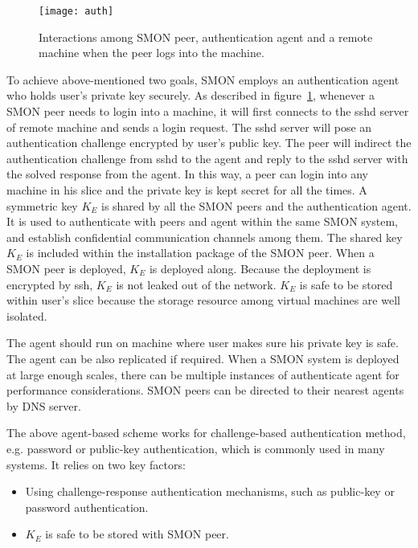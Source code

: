 \begin{figure}
\centering
\texttt{[image: auth]}
\caption{Interactions among SMON peer, authentication agent
and a remote machine when the peer logs into the machine.}
\label{fig:auth}
\end{figure}

To achieve above-mentioned two goals, SMON employs an
authentication agent who holds user's private key securely.
As described in figure~\ref{fig:auth}, whenever a SMON peer
needs to login into a machine, it will first connects to the
sshd server of remote machine and sends a login request. The
sshd server will pose an authentication challenge encrypted
by user's public key. The peer will indirect the
authentication challenge from sshd to the agent and reply to
the sshd server with the solved response from the agent. In
this way, a peer can login into any machine in his slice and
the private key is kept secret for all the times. A
symmetric key $K_E$ is shared by all the SMON peers and the
authentication agent. It is used to authenticate with peers
and agent within the same SMON system, and establish
confidential communication channels among them. The shared
key $K_E$ is included within the installation package of the
SMON peer. When a SMON peer is deployed, $K_E$ is deployed
along. Because the deployment is encrypted by ssh, $K_E$ is
not leaked out of the network. $K_E$ is safe to be stored
within user's slice because the storage resource among
virtual machines are well isolated.


The agent should run on machine where user makes sure his
private key is safe. The agent can be also replicated if
required. When a SMON system is deployed at large enough
scales, there can be multiple instances of authenticate
agent for performance considerations. SMON peers can be
directed to their nearest agents by DNS server.

The above agent-based scheme works for challenge-based
authentication method, e.g. password or public-key
authentication, which is commonly used in many systems.
It relies on two key factors:

\begin{itemize}

  \item Using challenge-response authentication mechanisms,
  such as public-key or password authentication.

  \item $K_E$ is safe to be stored with SMON peer.

\end{itemize}

